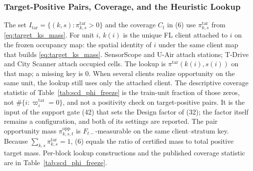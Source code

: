 \subsubsection{Target-Positive Pairs, Coverage, and the Heuristic Lookup}
\label{app:itar_lookup}
The set $I_{\mathrm{tar}}=\{(k,s):\pi^{\mathrm{tar}}_{k,s}>0\}$ and the
coverage $C_t$ in (6) use $\pi^{\mathrm{tar}}_{k,s}$ from
\eqref{eq:target_ks_mass}.  For unit $i$, $k(i)$ is the unique FL client
attached to $i$ on the frozen occupancy map: the spatial identity of $i$
under the same client map that builds \eqref{eq:target_ks_mass}.
SensorScope and U-Air attach stations; T-Drive and City Scanner attach
occupied cells.  The lookup is $\pi^{\mathrm{tar}}(k(i),s(i))$ on
that map; a missing key is $0$.  When several clients realize
opportunity on the same unit, the lookup still uses only the attached
client.  The descriptive coverage statistic of
Table~\ref{tab:scd_phi_freeze} is the train-unit
fraction of those zeros, not $\#\{i:\varpi_i^{\mathrm{tar}}=0\}$, and
not a positivity check on target-positive pairs.  It is the input of the
support gate (42) that sets the Design factor of (32); the factor itself
remains a configuration, and both of its settings are reported.
The pair opportunity mass $\pi^{\mathrm{opp}}_{k,s,t}$ is
$F_{t-}$-measurable on the same client--stratum key.
Because $\sum_{k,s}\pi^{\mathrm{tar}}_{k,s}=1$, (6) equals
the ratio of certified mass to total positive target mass.
Per-block lookup constructions and the published coverage statistic are in
Table~\ref{tab:scd_phi_freeze}.

